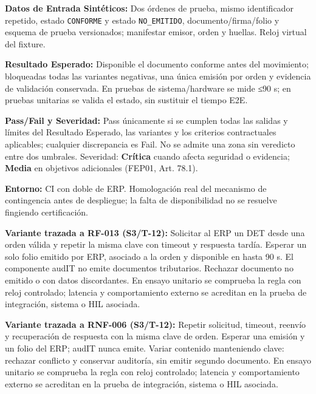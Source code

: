 \par\noindent\textbf{Datos de Entrada Sintéticos:} Dos órdenes de prueba, mismo identificador repetido, estado \texttt{C\allowbreak{}O\allowbreak{}N\allowbreak{}F\allowbreak{}O\allowbreak{}R\allowbreak{}M\allowbreak{}E\allowbreak{}} y estado \texttt{N\allowbreak{}O\allowbreak{}\_\allowbreak{}E\allowbreak{}M\allowbreak{}I\allowbreak{}T\allowbreak{}I\allowbreak{}D\allowbreak{}O\allowbreak{}}, documento/firma/folio y esquema de prueba versionados; manifestar emisor, orden y huellas. Reloj virtual del fixture.\par
\par\noindent\textbf{Resultado Esperado:} Disponible el documento conforme antes del movimiento; bloqueadas todas las variantes negativas, una única emisión por orden y evidencia de validación conservada. En pruebas de sistema/hardware se mide ≤90 s; en pruebas unitarias se valida el estado, sin sustituir el tiempo E2E.\par
\par\noindent\textbf{Pass/Fail y Severidad:} Pass únicamente si se cumplen todas las salidas y límites del Resultado Esperado, las variantes y los criterios contractuales aplicables; cualquier discrepancia es Fail. No se admite una zona sin veredicto entre dos umbrales. Severidad: \textbf{Crítica} cuando afecta seguridad o evidencia; \textbf{Media} en objetivos adicionales (FEP01, Art. 78.1).\par
\par\noindent\textbf{Entorno:} CI con doble de ERP. Homologación real del mecanismo de contingencia antes de despliegue; la falta de disponibilidad no se resuelve fingiendo certificación.\par


\par\noindent\textbf{Variante trazada a RF-013 (S3/T-12):} Solicitar al ERP un DET desde una orden válida y repetir la misma clave con timeout y respuesta tardía. Esperar un solo folio emitido por ERP, asociado a la orden y disponible en hasta 90 s. El componente audIT no emite documentos tributarios. Rechazar documento no emitido o con datos discordantes. En ensayo unitario se comprueba la regla con reloj controlado; latencia y comportamiento externo se acreditan en la prueba de integración, sistema o HIL asociada.\par

\par\noindent\textbf{Variante trazada a RNF-006 (S3/T-12):} Repetir solicitud, timeout, reenvío y recuperación de respuesta con la misma clave de orden. Esperar una emisión y un folio del ERP; audIT nunca emite. Variar contenido manteniendo clave: rechazar conflicto y conservar auditoría, sin emitir segundo documento. En ensayo unitario se comprueba la regla con reloj controlado; latencia y comportamiento externo se acreditan en la prueba de integración, sistema o HIL asociada.\par
